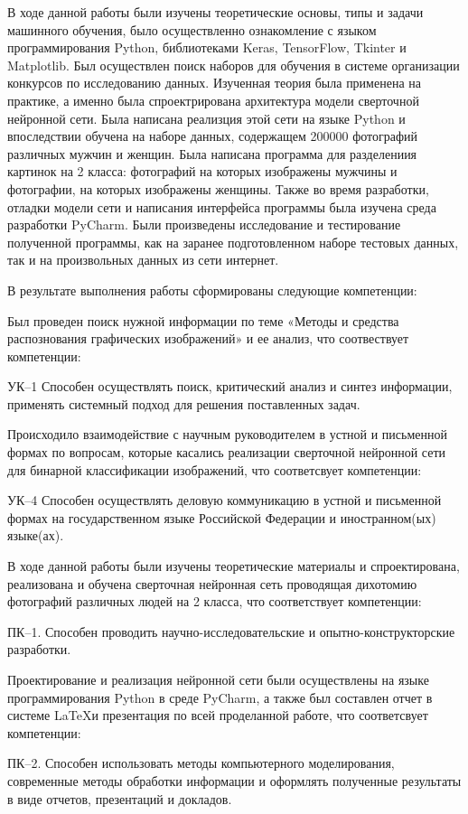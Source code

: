 \conclusion
В ходе данной работы были изучены теоретические основы, типы и задачи машинного обучения, было осуществленно ознакомление с языком программирования Python, библиотеками Keras, TensorFlow, Tkinter и Matplotlib. Был осуществлен поиск наборов для обучения в системе организации конкурсов по исследованию данных. Изученная теория была применена на практике, а именно была спроектрирована архитектура модели сверточной нейронной сети. Была написана реализция этой сети на языке Python и впоследствии обучена на наборе данных, содержащем 200000 фотографий различных мужчин и женщин. Была написана программа для разделениия картинок на 2 класса: фотографий на которых изображены мужчины и фотографии, на которых изображены женщины. Также во время разработки, отладки модели сети и написания интерфейса программы была изучена среда разработки PyCharm. Были произведены исследование и тестирование полученной программы, как на заранее подготовленном наборе тестовых данных, так и на произвольных данных из сети интернет. 

В результате выполнения работы сформированы следующие компетенции:

Был проведен поиск нужной информации по теме «Методы и средства распознования графических изображений» и ее анализ, что соотвествует компетенции:

УК--1 Способен осуществлять поиск, критический анализ и синтез информации, применять системный подход для решения поставленных задач.

Происходило взаимодействие с научным руководителем в устной и письменной формах по вопросам, которые касались реализации сверточной нейронной сети для бинарной классификации изображений, что соответсвует компетенции:

УК--4 Способен осуществлять деловую коммуникацию в устной и письменной формах на государственном языке Российской Федерации и иностранном(ых) языке(ах).

В ходе данной работы были изучены теоретические материалы и спроектирована, реализована и обучена сверточная нейронная сеть проводящая дихотомию фотографий различных людей на 2 класса, что соответствует компетенции:

ПК--1. Способен проводить научно-исследовательские и опытно-конструкторские разработки.

Проектирование и реализация нейронной сети были осуществлены на языке программирования Python в среде PyCharm, а также был составлен отчет в системе \LaTeX и презентация по всей проделанной работе, что соответсвует компетенции: 

ПК--2. Способен использовать методы компьютерного моделирования, современные методы обработки информации и оформлять полученные результаты в виде отчетов, презентаций и докладов.